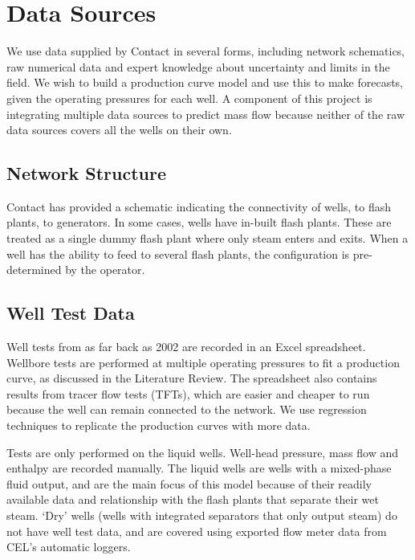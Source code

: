 \documentclass[a4paper, 12pt]{article}
\begin{document}
\section{Data Sources}
We use data supplied by Contact in several forms, including network schematics, raw numerical data and expert knowledge about uncertainty and limits in the field. We wish to build a production curve model and use this to make forecasts, given the operating pressures for each well. A component of this project is integrating multiple data sources to predict mass flow because neither of the raw data sources covers all the wells on their own.

\subsection{Network Structure}
Contact has provided a schematic indicating the connectivity of wells, to flash plants, to generators. In some cases, wells have in-built flash plants. These are treated as a single dummy flash plant where only steam enters and exits. When a well has the ability to feed to several flash plants, the configuration is pre-determined by the operator.

\subsection{Well Test Data}
Well tests from as far back as 2002 are recorded in an Excel spreadsheet. Wellbore tests are performed at multiple operating pressures to fit a production curve, as discussed in the Literature Review. The spreadsheet also contains results from tracer flow tests (TFTs), which are easier and cheaper to run because the well can remain connected to the network. We use regression techniques to replicate the production curves with more data.

Tests are only performed on the liquid wells. Well-head pressure, mass flow and enthalpy are recorded manually. The liquid wells are wells with a mixed-phase fluid output, and are the main focus of this model because of their readily available data and relationship with the flash plants that separate their wet steam.%
`Dry' wells (wells with integrated separators that only output steam) do not have well test data, and are covered using exported flow meter data from CEL's automatic loggers.
\end{document}
